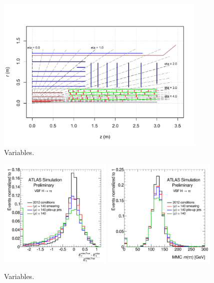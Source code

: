 \begin{figure}[tp]
  \centering
  \includegraphics[width=0.90\textwidth]{figures/PLOT-UPGRADE-2014-001/fig_08.pdf}
  \caption{Variables.}
  \label{fig:prospects-hllhc-layout}
\end{figure}

\begin{figure}[tp]
  \centering
  \includegraphics[width=0.48\textwidth]{figures/ATL-PHYS-PUB-2014-018/fig_01a}
  \includegraphics[width=0.48\textwidth]{figures/ATL-PHYS-PUB-2014-018/fig_01b}
  \caption{Variables.}
  \label{fig:prospects-hllhc-degradation}
\end{figure}

